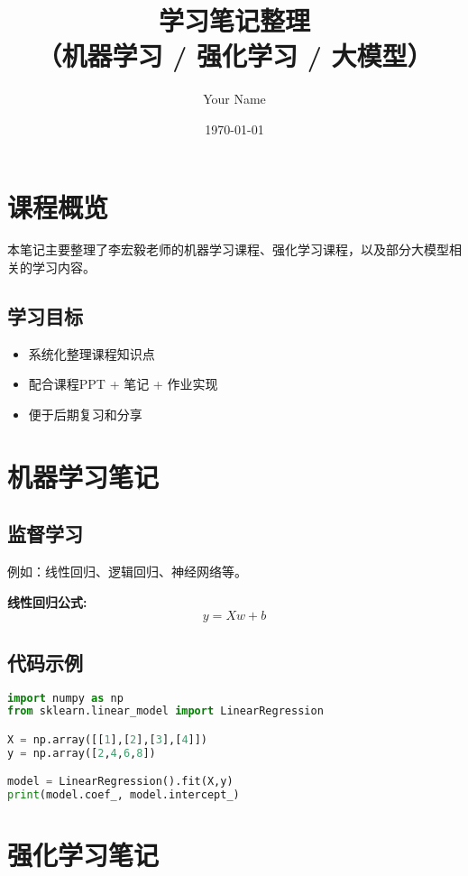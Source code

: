\documentclass[12pt,a4paper]{article}
\title{学习笔记整理 \\ \large（机器学习 / 强化学习 / 大模型）}
\author{Your Name}
\date{\today}
\begin{document}
\maketitle
\tableofcontents
\newpage

\section{课程概览}
本笔记主要整理了李宏毅老师的机器学习课程、强化学习课程，以及部分大模型相关的学习内容。  

\subsection{学习目标}
\begin{itemize}
    \item 系统化整理课程知识点
    \item 配合课程PPT + 笔记 + 作业实现
    \item 便于后期复习和分享
\end{itemize}

\section{机器学习笔记}

\subsection{监督学习}
例如：线性回归、逻辑回归、神经网络等。

\textbf{线性回归公式:}
\[
y = Xw + b
\]

\subsection{代码示例}
\begin{lstlisting}[language=Python, caption=线性回归示例]
import numpy as np
from sklearn.linear_model import LinearRegression

X = np.array([[1],[2],[3],[4]])
y = np.array([2,4,6,8])

model = LinearRegression().fit(X,y)
print(model.coef_, model.intercept_)
\end{lstlisting}

\section{强化学习笔记}
\end{document}

